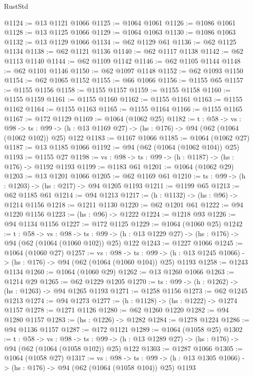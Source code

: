 \begin{lexlean}{RustStd}
\begin{coremodule}
{\begin{coremodule}
{{{{{{{{{@1124 := @13 @1121 @1066
@1125 := @1064 @1061
@1126 := @1086 @1061
@1128 := @13 @1125 @1066
@1129 := @1064 @1063
@1130 := @1086 @1063
@1132 := @13 @1129 @1066
@1134 := @62 @1129 @61
@1136 := @62 @1125 @1134
@1138 := @62 @1121 @1136
@1140 := @62 @1117 @1138
@1142 := @62 @1113 @1140
@1144 := @62 @1109 @1142
@1146 := @62 @1105 @1144
@1148 := @62 @1101 @1146
@1150 := @62 @1097 @1148
@1152 := @62 @1093 @1150
@1154 := @62 @1065 @1152
@1155 := @66 @1066
@1156 := @1155 @65
@1157 := @1155 @1156
@1158 := @1155 @1157
@1159 := @1155 @1158
@1160 := @1155 @1159
@1161 := @1155 @1160
@1162 := @1155 @1161
@1163 := @1155 @1162
@1164 := @1155 @1163
@1165 := @1155 @1164
@1166 := @1155 @1165
@1167 := @172 @1129
@1169 := @1064 (@1062 @25)
@1182 := {t : @58} ->
  {vs : @98} ->
  {ts : @99} -> (h : @13 @1169 @27) -> (hs : @176) -> @94 (@62 (@1064 (@1062 @102)) @25) @122
@1183 := @1167 @1066
@1185 := @1064 (@1062 @27)
@1187 := @13 @1185 @1066
@1192 := @94 (@62 (@1064 (@1062 @104)) @25)
@1193 := @1155 @27
@1198 := {vs : @98} -> {ts : @99} -> (h : @1187) -> (hs : @176) -> @1192 @1193
@1199 := @1183 @61
@1201 := @1064 (@1062 @29)
@1203 := @13 @1201 @1066
@1205 := @62 @1169 @61
@1210 := {ts : @99} -> (h : @1203) -> (hs : @217) -> @94 @1205 @1193
@1211 := @1199 @65
@1213 := @62 @1185 @61
@1214 := @94 @1213
@1217 := (h : @1132) -> (hs : @96) -> @1214 @1156
@1218 := @1211 @1130
@1220 := @62 @1201 @61
@1222 := @94 @1220 @1156
@1223 := (hs : @96) -> @1222
@1224 := @1218 @93
@1226 := @94 @1134 @1156
@1227 := @172 @1125
@1229 := @1064 (@1060 @25)
@1242 := {t : @58} ->
  {vs : @98} ->
  {ts : @99} -> (h : @13 @1229 @27) -> (hs : @176) -> @94 (@62 (@1064 (@1060 @102)) @25) @122
@1243 := @1227 @1066
@1245 := @1064 (@1060 @27)
@1257 := {vs : @98} ->
  {ts : @99} -> (h : @13 @1245 @1066) -> (hs : @176) -> @94 (@62 (@1064 (@1060 @104)) @25) @1193
@1258 := @1243 @1134
@1260 := @1064 (@1060 @29)
@1262 := @13 @1260 @1066
@1263 := @1214 @29
@1265 := @62 @1229 @1205
@1270 := {ts : @99} -> (h : @1262) -> (hs : @1263) -> @94 @1265 @1193
@1271 := @1258 @1156
@1273 := @62 @1245 @1213
@1274 := @94 @1273
@1277 := (h : @1128) -> (hs : @1222) -> @1274 @1157
@1278 := @1271 @1126
@1280 := @62 @1260 @1220
@1282 := @94 @1280 @1157
@1283 := (hs : @1226) -> @1282
@1284 := @1278 @1224
@1286 := @94 @1136 @1157
@1287 := @172 @1121
@1289 := @1064 (@1058 @25)
@1302 := {t : @58} ->
  {vs : @98} ->
  {ts : @99} -> (h : @13 @1289 @27) -> (hs : @176) -> @94 (@62 (@1064 (@1058 @102)) @25) @122
@1303 := @1287 @1066
@1305 := @1064 (@1058 @27)
@1317 := {vs : @98} ->
  {ts : @99} -> (h : @13 @1305 @1066) -> (hs : @176) -> @94 (@62 (@1064 (@1058 @104)) @25) @1193
}}}}}}}}}
\end{coremodule}}
\end{coremodule}
\end{lexlean}
